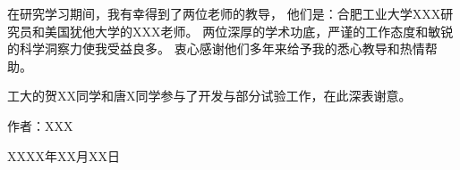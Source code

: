 
\begin{acknowledgements}

在研究学习期间，我有幸得到了两位老师的教导，
他们是：合肥工业大学XXX研究员和美国犹他大学的XXX老师。
两位深厚的学术功底，严谨的工作态度和敏锐的科学洞察力使我受益良多。
衷心感谢他们多年来给予我的悉心教导和热情帮助。

工大的贺XX同学和唐X同学参与了开发与部分试验工作，在此深表谢意。
~\\
\begin{flushright}
作者：XXX

XXXX年XX月XX日
\end{flushright}

\end{acknowledgements}
